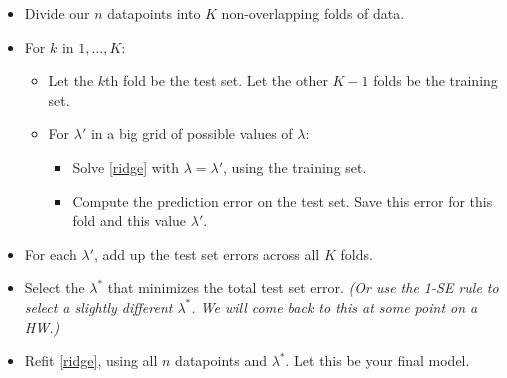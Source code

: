 \begin{itemize}
\item Divide our $n$ datapoints into $K$ non-overlapping folds of data. 
\item For $k$ in $1,\ldots,K$:
\begin{itemize}
\item Let the $k$th fold be the test set. Let the other $K-1$ folds be the training set. 
\item For $\lambda'$ in a big grid of possible values of $\lambda$:
\begin{itemize}
\item Solve \eqref{ridge} with $\lambda=\lambda'$, using the training set. 
\item Compute the prediction error on the test set. Save this error for this fold and this value $\lambda'$. 
\end{itemize}
\end{itemize}
\item For each $\lambda'$, add up the test set errors across all $K$ folds.
\item Select the $\lambda^*$ that minimizes the total test set error. \emph{(Or use the 1-SE rule to select a slightly different $\lambda^*$. We will come back to this at some point on a HW.)}
\item Refit \eqref{ridge}, using all $n$ datapoints and $\lambda^*$. Let this be your final model. 
\end{itemize}

